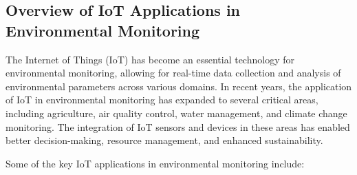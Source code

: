 \documentclass[12pt,a4paper,oneside,english]{book}
\begin{document}
\subsection{Overview of IoT Applications in Environmental Monitoring}
The Internet of Things (IoT) has become an essential technology for environmental monitoring, allowing for real-time data collection and analysis of environmental parameters across various domains. In recent years, the application of IoT in environmental monitoring has expanded to several critical areas, including agriculture, air quality control, water management, and climate change monitoring. The integration of IoT sensors and devices in these areas has enabled better decision-making, resource management, and enhanced sustainability.

Some of the key IoT applications in environmental monitoring include:
\end{document}
